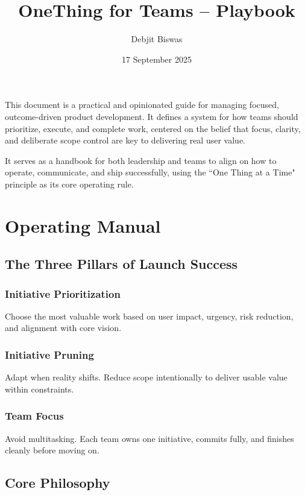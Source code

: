 \documentclass[a4paper]{article}
\title{OneThing for Teams -- Playbook}
\author{Debjit Biswas}
\date{17 September 2025}
\begin{document}
\maketitle

\setlength{\parindent}{0pt}
\setlength\parskip{2ex plus 0.2ex minus 0.4ex}

This document is a practical and opinionated guide for managing focused, outcome-driven product development. It defines a system for how teams should prioritize, execute, and complete work, centered on the belief that focus, clarity, and deliberate scope control are key to delivering real user value.

It serves as a handbook for both leadership and teams to align on how to operate, communicate, and ship successfully, using the ``One Thing at a Time" principle as its core operating rule.

\section{Operating Manual}

\subsection*{The Three Pillars of Launch Success}

\subsubsection*{Initiative Prioritization}
Choose the most valuable work based on user impact, urgency, risk reduction, and alignment with
core vision.

\subsubsection*{Initiative Pruning}
Adapt when reality shifts. Reduce scope intentionally to deliver usable value within constraints.

\subsubsection*{Team Focus}
Avoid multitasking. Each team owns one initiative, commits fully, and finishes cleanly before moving on.


\subsection*{Core Philosophy}
\end{document}
